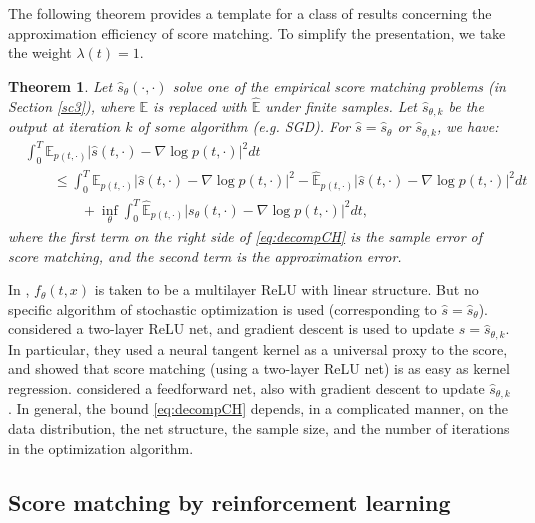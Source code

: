 \documentclass[letterpaper,11pt,reqno]{amsart}
\newtheorem{theorem}{Theorem}[section]
\numberwithin{equation}{section}
\begin{document}
\quad The following theorem provides a template for a class of results
concerning the approximation efficiency of score matching.
To simplify the presentation,
we take the weight $\lambda(t) = 1$.
\begin{theorem}
\cite{CH23, HR24}
Let $\widehat{s}_{\theta}(\cdot, \cdot)$ solve
one of the empirical score matching problems (in Section \ref{sc3}),
where $\mathbb{E}$ is replaced with $\widehat{\mathbb{E}}$ under finite samples.
Let $\widehat{s}_{\theta, k}$ be the output at iteration $k$ of some algorithm (e.g. SGD).
For $\widehat{s} = \widehat{s}_{\theta}$ or $\widehat{s}_{\theta, k}$,
we have: 
\begin{equation}
\label{eq:decompCH}
\begin{aligned}
& \int_{0}^T \mathbb{E}_{p(t, \cdot)}|\widehat{s}(t, \cdot) - \nabla \log p (t, \cdot)|^2 dt \\
& \qquad \le \int_{0}^T  \mathbb{E}_{p(t, \cdot)}|\widehat{s}(t, \cdot) - \nabla \log p (t, \cdot)|^2 
- \widehat{\mathbb{E}}_{p(t, \cdot)}|\widehat{s}(t, \cdot) - \nabla \log p (t, \cdot)|^2  dt \\
& \qquad \qquad +\inf_{\theta} \int_{0}^T \widehat{\mathbb{E}}_{p(t, \cdot)}| s_\theta(t, \cdot) - \nabla \log p (t, \cdot)|^2 dt,
\end{aligned}
\end{equation}
where the first term on the right side of \eqref{eq:decompCH} is the sample error of
score matching,
and the second term is the approximation error.
\end{theorem}

\quad In \cite{CH23}, $f_\theta(t,x)$ is taken to be a multilayer ReLU with linear structure.
But no specific algorithm of stochastic optimization is used 
(corresponding to $\widehat{s} = \widehat{s}_\theta$).
\cite{HR24} considered a two-layer ReLU net, 
and gradient descent is used to update $\widehat{s} = \widehat{s}_{\theta,k}$.
In particular, they used a neural tangent kernel as a universal proxy to the score,
and 
showed that score matching (using a two-layer ReLU net) is as easy as kernel regression.
\cite{WHT24} considered a feedforward net, also with gradient descent to update $\widehat{s}_{\theta,k}$.
In general, the bound \eqref{eq:decompCH} depends,
in a complicated manner,
on the data distribution, 
the net structure,
the sample size,
and the number of iterations in the optimization algorithm.

\subsection{Score matching by reinforcement learning}
\label{sc53}
\end{document}
